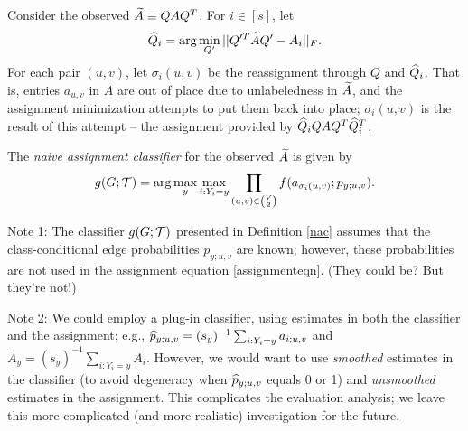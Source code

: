
%
%

Consider the observed $\widetilde{A} \equiv QAQ^T$.
For $i \in [s]$, let
\begin{eqnarray}\label{assignmenteqn}
\widehat{Q}_i = \arg\min_{Q'} ||Q'^T \widetilde{A} Q' - A_i||_F.
\end{eqnarray}
For each pair $(u,v)$, let $\sigma_i(u,v)$ be the reassignment through $Q$ and $\widehat{Q}_i$.
That is, entries $a_{u,v}$ in $A$ are out of place due to unlabeledness in $\widetilde{A}$,
and the assignment minimization attempts to put them back into place;
$\sigma_i(u,v)$ is the result of this attempt -- the assignment provided by
$\widehat{Q}_i Q A Q^T \widehat{Q}_i^T$.




\label{nac}
The {\em naive assignment classifier} for the observed $\widetilde{A}$ is given by
\begin{eqnarray}
g(G;\mathcal{T}) = {\arg\max_y \max_{i:Y_i=y} \prod_{(u,v) \in {V \choose 2}} f(a_{\sigma_i(u,v)};p_{y;u,v})}.
\end{eqnarray}

Note 1:
The classifier $g(G;\mathcal{T})$ presented in Definition \ref{nac}
assumes that the class-conditional edge probabilities $p_{y;u,v}$ are known;
however, these probabilities are not used in the assignment equation \ref{assignmenteqn}.
(They could be? But they're not!)

Note 2:
We could employ a plug-in classifier,
using estimates in both the classifier and the assignment;
e.g., $\widehat{p}_{y;u,v} = (s_y)^{-1} \sum_{i:Y_i=y} a_{i;u,v}$
and $\overline{A}_y = (s_y)^{-1} \sum_{i:Y_i=y} A_{i}$.
However, we would want to use {\em smoothed} estimates in the classifier
(to avoid degeneracy when $\widehat{p}_{y;u,v}$ equals 0 or 1)
and {\em unsmoothed} estimates in the assignment.
This complicates the evaluation analysis;
we leave this more complicated (and more realistic) investigation for the future.

